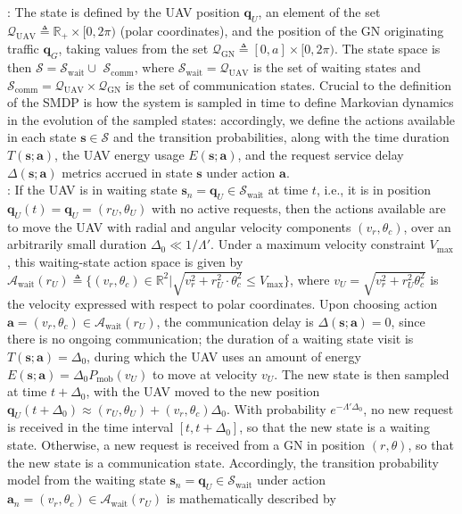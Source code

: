 \documentclass[10pt, twocolumn]{IEEEtran}
\theoremstyle{plain}
\theoremstyle{definition}
\theoremstyle{remark}
\begin{document}
: The state is defined by the UAV position $\mathbf{q}_{U}$, an element of the set $\mathcal{Q}_{\mathrm{UAV}}{\triangleq}\mathbb{R}_{+}{\times}[0,2\pi)$ (polar coordinates), and the position of the GN originating traffic $\mathbf{q}_G$, taking values from the set  $\mathcal{Q}_{\mathrm{GN}}{\triangleq}[0,a]{\times}[0,2\pi)$. The state space is then $\mathcal{S}{=}\mathcal{S}_{\mathrm{wait}}{\cup}$ $\mathcal{S}_{\mathrm{comm}}$, where $\mathcal{S}_{\mathrm{wait}}{=}\mathcal{Q}_{\mathrm{UAV}}$ is the set of {waiting} states and $\mathcal{S}_{\mathrm{comm}}{=}\mathcal{Q}_{\mathrm{UAV}}{\times}\mathcal{Q}_{\mathrm{GN}}$ is the set of {communication} states. Crucial to the definition of the SMDP is how the system is sampled in time to define Markovian dynamics in the evolution of the sampled states: accordingly, we define the actions available in each state $\mathbf{s}{\in}\mathcal{S}$ and the transition probabilities, along with the time duration $T(\mathbf{s};\mathbf{a})$, the UAV energy usage $E(\mathbf{s};\mathbf{a})$, and the request service delay $\Delta(\mathbf{s};\mathbf{a})$ metrics accrued in state $\mathbf{s}$ under action $\mathbf{a}$.\\
: If the UAV is in {waiting} state $\mathbf{s}_{n}{=}\mathbf{q}_{U}{\in}\mathcal{S}_{\mathrm{wait}}$ at time $t$, i.e., it is in position $\mathbf{q}_{U}(t){=}\mathbf{q}_{U}{=}(r_{U},\theta_{U})$ with no active requests, then the actions available are to move the UAV with radial and angular velocity components $(v_{r},\theta_{c})$, over an arbitrarily small duration $\Delta_{0}{\ll}1/\Lambda'$. Under a maximum velocity constraint $V_{\mathrm{max}}$, this waiting-state action space is given by $\mathcal{A}_{\mathrm{wait}}(r_{U}){\triangleq}\Big\{(v_{r},\theta_{c}){\in}\mathbb{R}^{2}\Big|\sqrt{v_{r}^{2}{+}r_{U}^{2}{\cdot}\theta_{c}^{2}}{\leq}V_{\mathrm{max}} \Big\}$, where $v_{U}{=}\sqrt{v_{r}^{2}{+}r_{U}^{2}\theta_{c}^{2}}$ is the velocity expressed with respect to polar coordinates. Upon choosing action $\mathbf{a}{=}(v_{r},\theta_{c}){\in}\mathcal{A}_{\mathrm{wait}}(r_{U})$, the communication delay is $\Delta(\mathbf{s};\mathbf{a}){=}0$, since there is no ongoing communication; the duration of a waiting state visit is $T(\mathbf{s};\mathbf{a}){=}\Delta_{0}$, during which the UAV uses an amount of energy $E(\mathbf{s};\mathbf{a}){=}\Delta_{0}P_{\mathrm{mob}} \left(v_{U}\right)$ to move at velocity $v_{U}$. The new state is then sampled at time $t{+}\Delta_{0}$, with the UAV moved to the new position $\mathbf{q}_{U}(t{+}\Delta_{0}){\approx}(r_{U},\theta_{U}){+}(v_{r},\theta_{c})\Delta_{0}$. With probability $e^{-\Lambda'\Delta_{0}}$, no new request is received in the time interval $[t,t{+}\Delta_{0}]$, so that the new state is a waiting state.  Otherwise, a new request is received from a GN in position $(r,\theta)$, so that the new state is a communication state. Accordingly, the transition probability model from the waiting state $\mathbf{s}_{n}{=}\mathbf{q}_{U}{\in}\mathcal{S}_\mathrm{wait}$ under action $\mathbf{a}_{n}{=}(v_{r},\theta_{c}){\in}\mathcal{A}_{\mathrm{wait}}(r_{U})$ is mathematically described by
\end{document}

